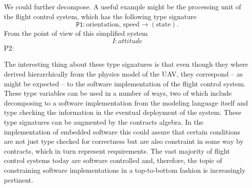\documentclass{article}
\begin{document}
We could further decompose. A useful example might be the processing unit of the flight control system, which has the following type signature
\[\mathtt{P1}: \text{orientation, speed} \rightarrow (\text{state}).\]
 From the point of view of this simplified system
\[I: attitude\]
P2:

The interesting thing about these type signatures is that even though they where derived hierarchically from the physics model of the UAV, they correspond -- as might be expected -- to the software implementation of the flight control system.
These type variables can be used in a number of ways, two of which include decomposing to a software implementation from the modeling language itself and type checking the information in the eventual deployment of the system.
These type signatures can be augmented by the contracts algebra.
In the implementation of embedded software this could assure
that certain conditions are not just type checked for correctness
but are also constraint in some way by contracts, which in turn represent requirements.
The vast majority of flight control systems today are software controlled and, therefore, the topic of constraining software implementations in a top-to-bottom fashion is increasingly pertinent.



\end{document}
